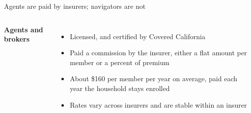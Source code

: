 \documentclass[aspectratio=169,11pt]{beamer}
\begin{document}
\begin{frame}[t]{Agents are paid by insurers; navigators are not}
  \vspace{0.3cm}
  \begin{columns}[t,onlytextwidth]
      {\bfseries\color{emoryGold} Agents and brokers}
      \begin{itemize}
        \item Licensed, and certified by Covered California
        \item Paid a commission by the insurer, either a flat amount per member or a percent of premium
        \item About \$160 per member per year on average, paid each year the household stays enrolled
        \item Rates vary across insurers and are stable within an insurer
      \end{itemize}
  \end{columns}
\end{frame}
\end{document}
